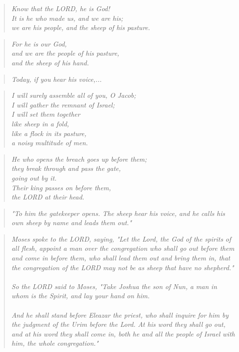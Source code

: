 \documentclass[10pt,oneside,footinclude=true,headinclude=true]{scrbook} %
\newcommand\quot[1]{
	\begin{quote}\textit{\small#1}\end{quote}
}
\begin{document}
\quot{Know that the LORD, he is God!\\
\hspace*{5mm}It is he who made us, and we are his;\\
\hspace*{5mm}we are his people, and the sheep of his pasture.}

\quot{For he is our God,\\
\hspace*{5mm}and we are the people of his pasture,\\
\hspace*{5mm}and the sheep of his hand.}

\quot{Today, if you hear his voice,...}

\quot{I will surely assemble all of you, O Jacob;\\
\hspace*{5mm}I will gather the remnant of Israel;\\
I will set them together\\
\hspace*{5mm}like sheep in a fold,\\
like a flock in its pasture,\\
\hspace*{5mm}a noisy multitude of men.}

\quot{He who opens the breach goes up before them;\\
\hspace*{5mm}they break through and pass the gate,\\
\hspace*{5mm}going out by it.\\
Their king passes on before them,\\
\hspace*{5mm}the LORD at their head.}

\quot{"To him the gatekeeper opens. The sheep hear his voice, and he calls his own sheep by name and leads them out."}

\quot{Moses spoke to the LORD, saying, "Let the Lord, the God of the spirits of all flesh, appoint a man over the congregation who shall go out before them and come in before them, who shall lead them out and bring them in, that the congregation of the LORD may not be as sheep that have no shepherd."\\
\\
So the LORD said to Moses, "Take Joshua the son of Nun, a man in whom is the Spirit, and lay your hand on him.\\
\\
And he shall stand before Eleazar the priest, who shall inquire for him by the judgment of the Urim before the Lord. At his word they shall go out, and at his word they shall come in, both he and all the people of Israel with him, the whole congregation."}
\end{document}
